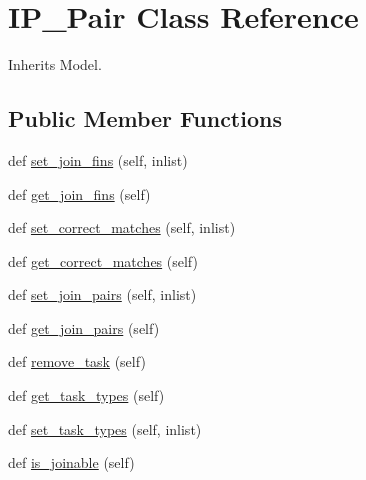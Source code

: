 \hypertarget{classdynamicfilterapp_1_1models_1_1_i_p___pair}{}\section{I\+P\+\_\+\+Pair Class Reference}
\label{classdynamicfilterapp_1_1models_1_1_i_p___pair}


Inherits Model.

\subsection*{Public Member Functions}
\begin{DoxyCompactItemize}
\item 
def \mbox{\hyperlink{classdynamicfilterapp_1_1models_1_1_i_p___pair_a2469f89d3ff5860060ad5d6ee5bed6aa}{set\+\_\+join\+\_\+fins}} (self, inlist)
\item 
def \mbox{\hyperlink{classdynamicfilterapp_1_1models_1_1_i_p___pair_ad4a4fd5953d6391fe93c0313af62179f}{get\+\_\+join\+\_\+fins}} (self)
\item 
def \mbox{\hyperlink{classdynamicfilterapp_1_1models_1_1_i_p___pair_a1e690d6df7dc40428d200ce0494eb72a}{set\+\_\+correct\+\_\+matches}} (self, inlist)
\item 
def \mbox{\hyperlink{classdynamicfilterapp_1_1models_1_1_i_p___pair_ac0edbf94b370ed541539c84ecfede353}{get\+\_\+correct\+\_\+matches}} (self)
\item 
def \mbox{\hyperlink{classdynamicfilterapp_1_1models_1_1_i_p___pair_a7e9ff2535b53d8ece5a3f55f2abe05ed}{set\+\_\+join\+\_\+pairs}} (self, inlist)
\item 
def \mbox{\hyperlink{classdynamicfilterapp_1_1models_1_1_i_p___pair_a5a823d5be0be531512663d1c5a449e80}{get\+\_\+join\+\_\+pairs}} (self)
\item 
def \mbox{\hyperlink{classdynamicfilterapp_1_1models_1_1_i_p___pair_a88c991de34eb29936f716526d4b7f86d}{remove\+\_\+task}} (self)
\item 
def \mbox{\hyperlink{classdynamicfilterapp_1_1models_1_1_i_p___pair_ab5ba298be003142db12f57fa67c40a66}{get\+\_\+task\+\_\+types}} (self)
\item 
def \mbox{\hyperlink{classdynamicfilterapp_1_1models_1_1_i_p___pair_a53675dee30c576ef2c5dd654017626b1}{set\+\_\+task\+\_\+types}} (self, inlist)
\item 
def \mbox{\hyperlink{classdynamicfilterapp_1_1models_1_1_i_p___pair_a9dbf793309717a1d54169b53de55a88c}{is\+\_\+joinable}} (self)
\item 

\end{DoxyCompactItemize}
